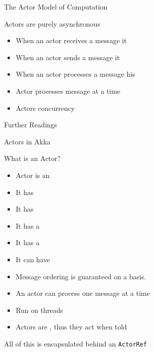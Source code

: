 \begin{frame}{The Actor Model of Computation}
\begin{block}{Actors are purely asynchronous}
\begin{itemize}
  \item When an actor receives a message it 
  \item When an actor sends a message it 
  \item When an actor processes a message his 
  \item Actor processes  message at a time 
  \item Actors  concurrency
\end{itemize}
\end{block}
\end{frame}

\begin{frame}{Further Readings}
\begin{center}
\end{center}
\begin{center}
\end{center}
\end{frame}


\begin{frame}{Actors in Akka}
\begin{block}{What is an Actor?}
\begin{itemize}
  \item Actor is an 
  \item It has 
  \item It has 
  \item It has a 
  \item It has a 
  \item It can have 
  \item Message ordering is guaranteed on a  basis.
  \item An actor can process one message at a time
  \item Run on  threads
  \item Actors are , thus they act when told
\end{itemize}
All of this is encapsulated behind an \lstinline!ActorRef!
\end{block}
\end{frame}

